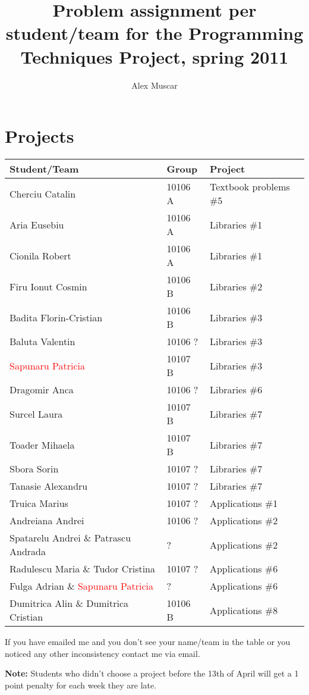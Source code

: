 \documentclass{article}
\begin{document}
\title{Problem assignment per student/team for the Programming Techniques Project, spring 2011}
\author{Alex Muscar}
\maketitle

\section{Projects}

\begin{center}
  \begin{tabular}{ | l | l | l | }
    \hline
    \textbf{Student/Team} & \textbf{Group} & \textbf{Project} \\ \hline
    Cherciu Catalin & 10106 A &Textbook problems \#5 \\ \hline
    Aria Eusebiu & 10106 A & Libraries \#1 \\ \hline
    Cionila Robert & 10106 A & Libraries \#1 \\ \hline
    Firu Ionut Cosmin & 10106 B & Libraries \#2 \\ \hline
    Badita Florin-Cristian & 10106 B & Libraries \#3 \\ \hline
    Baluta Valentin & 10106 ? & Libraries \#3 \\ \hline
    \textcolor{red}{Sapunaru Patricia} & 10107 B & Libraries \#3 \\ \hline
    Dragomir Anca & 10106 ? & Libraries \#6 \\ \hline
    Surcel Laura & 10107 B & Libraries \#7 \\ \hline
    Toader Mihaela & 10107 B & Libraries \#7 \\ \hline
    Sbora Sorin & 10107 ? & Libraries \#7 \\ \hline
    Tanasie Alexandru & 10107 ? & Libraries \#7 \\ \hline
    Truica Marius & 10107 ? & Applications \#1 \\ \hline
    Andreiana Andrei & 10106 ? & Applications \#2 \\ \hline
    Spatarelu Andrei \& Patrascu Andrada & ? & Applications \#2 \\ \hline
    Radulescu Maria \& Tudor Cristina & 10107 ? & Applications \#6 \\ \hline
    Fulga Adrian \& \textcolor{red}{Sapunaru Patricia} & ? & Applications \#6 \\ \hline
    Dumitrica Alin \& Dumitrica Cristian & 10106 B & Applications \#8 \\
    \hline
  \end{tabular}
\end{center}

If you have emailed me and you don't see your name/team in the table or you noticed any other inconsistency contact me via email.

\textbf{Note:} Students who didn't choose a project before the 13th of April will get a 1 point penalty for each week they are late.
\end{document}
